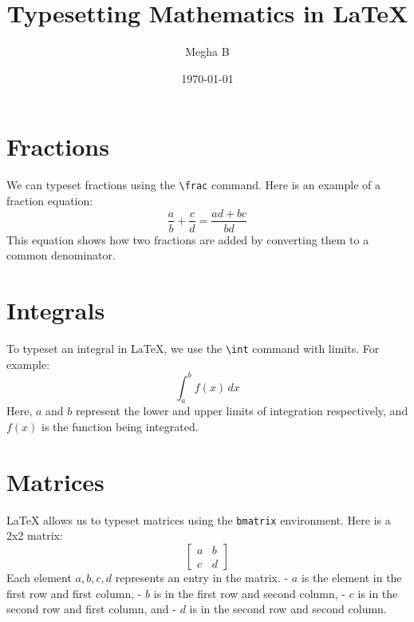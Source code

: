 \documentclass{article}
\title{Typesetting Mathematics in LaTeX}
\author{Megha B}
\date{\today}
\begin{document}
\maketitle

\section*{Fractions}
We can typeset fractions using the \texttt{\textbackslash frac} command.  
Here is an example of a fraction equation:
\[
\frac{a}{b} + \frac{c}{d} = \frac{ad + bc}{bd}
\]
This equation shows how two fractions are added by converting them to a common denominator.

\section*{Integrals}
To typeset an integral in LaTeX, we use the \texttt{\textbackslash int} command with limits.  
For example:
\[
\int_a^b f(x) \, dx
\]
Here, \( a \) and \( b \) represent the lower and upper limits of integration respectively, and \( f(x) \) is the function being integrated.

\section*{Matrices}
LaTeX allows us to typeset matrices using the \texttt{bmatrix} environment.  
Here is a 2x2 matrix:
\[
\begin{bmatrix}
a & b \\
c & d
\end{bmatrix}
\]
Each element \( a, b, c, d \) represents an entry in the matrix.  
- \( a \) is the element in the first row and first column,  
- \( b \) is in the first row and second column,  
- \( c \) is in the second row and first column, and  
- \( d \) is in the second row and second column.
\end{document}
